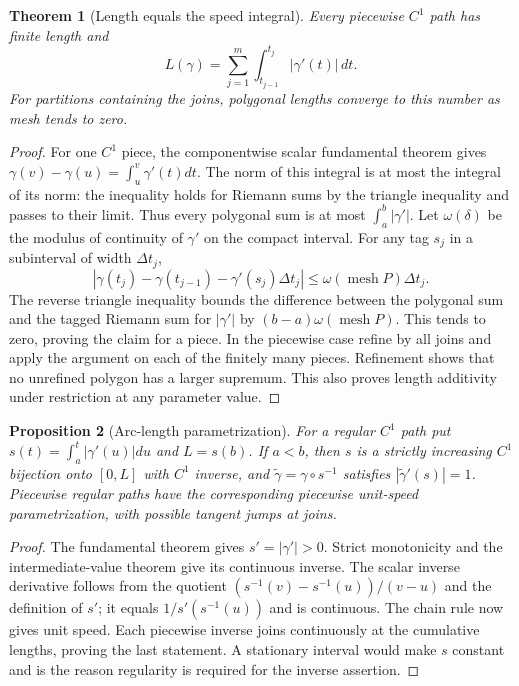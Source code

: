 \documentclass[11pt,oneside,openany]{book}
\newtheorem{theorem}{Theorem}[chapter]
\newtheorem{proposition}[theorem]{Proposition}
\theoremstyle{definition}
\theoremstyle{remark}
\begin{document}
\begin{theorem}[Length equals the speed integral]\label{d04:09:length}
Every piecewise $C^1$ path has finite length and
\[
 L(\gamma)=\sum_{j=1}^m\int_{t_{j-1}}^{t_j}|\gamma'(t)|\,dt.
\]
For partitions containing the joins, polygonal lengths converge to this
number as mesh tends to zero.
\end{theorem}
\begin{proof}
For one $C^1$ piece, the componentwise scalar fundamental theorem gives
$\gamma(v)-\gamma(u)=\int_u^v\gamma'(t)dt$. The norm of this integral is
at most the integral of its norm: the inequality holds for Riemann sums
by the triangle inequality and passes to their limit. Thus every polygonal
sum is at most $\int_a^b|\gamma'|$.
Let $\omega(\delta)$ be the modulus of continuity of $\gamma'$ on the
compact interval. For any tag $s_j$ in a subinterval of width $\Delta t_j$,
\[
 |\gamma(t_j)-\gamma(t_{j-1})-\gamma'(s_j)\Delta t_j|
 \le\omega(\operatorname{mesh}P)\Delta t_j.
\]
The reverse triangle inequality bounds the difference between the polygonal
sum and the tagged Riemann sum for $|\gamma'|$ by
$(b-a)\omega(\operatorname{mesh}P)$. This tends to zero, proving the
claim for a piece. In the piecewise case refine by all joins and apply the
argument on each of the finitely many pieces. Refinement shows that no
unrefined polygon has a larger supremum. This also proves length additivity
under restriction at any parameter value.
\end{proof}

\begin{proposition}[Arc-length parametrization]\label{d04:09:arclength}
For a regular $C^1$ path put $s(t)=\int_a^t|\gamma'(u)|du$ and $L=s(b)$.
If $a<b$, then $s$ is a strictly increasing $C^1$ bijection onto $[0,L]$
with $C^1$ inverse, and $\widetilde\gamma=\gamma\circ s^{-1}$ satisfies
$|\widetilde\gamma'(s)|=1$. Piecewise regular paths have the corresponding
piecewise unit-speed parametrization, with possible tangent jumps at joins.
\end{proposition}
\begin{proof}
The fundamental theorem gives $s'=|\gamma'|>0$. Strict monotonicity and
the intermediate-value theorem give its continuous inverse. The scalar
inverse derivative follows from the quotient
$(s^{-1}(v)-s^{-1}(u))/(v-u)$ and the definition of $s'$; it equals
$1/s'(s^{-1}(u))$ and is continuous. The chain rule now gives unit speed.
Each piecewise inverse joins continuously at the cumulative lengths, proving
the last statement. A stationary interval would make $s$ constant and is
the reason regularity is required for the inverse assertion.
\end{proof}
\end{document}
